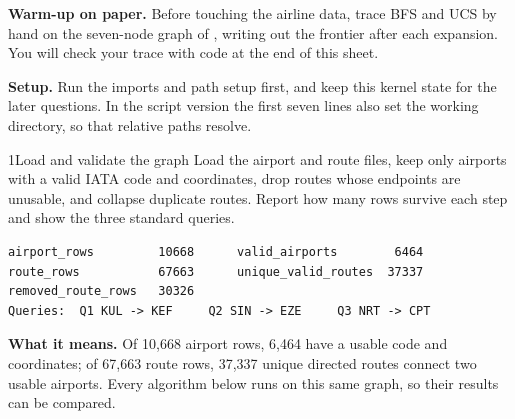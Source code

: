 \begin{yourturn}
\textbf{Warm-up on paper.} Before touching the airline data, trace BFS and UCS by hand on the seven-node graph of , writing out the frontier after each expansion. You will check your trace with code at the end of this sheet.
\end{yourturn}

\textbf{Setup.} Run the imports and path setup first, and keep this kernel state for the later questions. In the script version the first seven lines also set the working directory, so that relative paths resolve.



\begin{labquestion}{1}{Load and validate the graph}
Load the airport and route files, keep only airports with a valid IATA code and coordinates, drop routes whose endpoints are unusable, and collapse duplicate routes. Report how many rows survive each step and show the three standard queries.
\end{labquestion}
\begin{labanswer}


\begin{refoutput}
\begin{lstlisting}[style=utpterminal]
airport_rows         10668      valid_airports        6464
route_rows           67663      unique_valid_routes  37337
removed_route_rows   30326
Queries:  Q1 KUL -> KEF     Q2 SIN -> EZE     Q3 NRT -> CPT
\end{lstlisting}
\end{refoutput}

\textbf{What it means.} Of 10,668 airport rows, 6,464 have a usable code and coordinates; of 67,663 route rows, 37,337 unique directed routes connect two usable airports. Every algorithm below runs on this same graph, so their results can be compared.
\end{labanswer}

